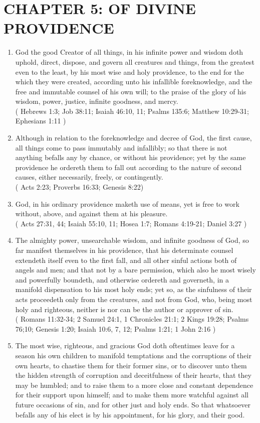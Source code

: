 \documentclass[12pt,a4paper]{book}
\begin{document}
\chapter{CHAPTER 5: OF DIVINE PROVIDENCE}
\label{ch-div-prov}
\begin{enumerate}
\item God the good Creator of all things, in his infinite power and wisdom doth uphold, direct, dispose, and govern all creatures and things, from the greatest even to the least, by his most wise and holy providence, to the end for the which they were created, according unto his infallible foreknowledge, and the free and immutable counsel of his own will; to the praise of the glory of his wisdom, power, justice, infinite goodness, and mercy.\\
( Hebrews 1:3; Job 38:11; Isaiah 46:10, 11; Psalms 135:6; Matthew 10:29-31; Ephesians 1:11 )
\item Although in relation to the foreknowledge and decree of God, the first cause, all things come to pass immutably and infallibly; so that there is not anything befalls any by chance, or without his providence; yet by the same providence he ordereth them to fall out according to the nature of second causes, either necessarily, freely, or contingently.\\
( Acts 2:23; Proverbs 16:33; Genesis 8:22)
\item God, in his ordinary providence maketh use of means, yet is free to work without, above, and against them at his pleasure.\\
( Acts 27:31, 44; Isaiah 55:10, 11; Hosea 1:7; Romans 4:19-21; Daniel 3:27 )
\item The almighty power, unsearchable wisdom, and infinite goodness of God, so far manifest themselves in his providence, that his determinate counsel extendeth itself even to the first fall, and all other sinful actions both of angels and men; and that not by a bare permission, which also he most wisely and powerfully boundeth, and otherwise ordereth and governeth, in a manifold dispensation to his most holy ends; yet so, as the sinfulness of their acts proceedeth only from the creatures, and not from God, who, being most holy and righteous, neither is nor can be the author or approver of sin.\\
( Romans 11:32-34; 2 Samuel 24:1, 1 Chronicles 21:1; 2 Kings 19:28; Psalms 76;10; Genesis 1:20; Isaiah 10:6, 7, 12; Psalms 1:21; 1 John 2:16 )
\item The most wise, righteous, and gracious God doth oftentimes leave for a season his own children to manifold temptations and the corruptions of their own hearts, to chastise them for their former sins, or to discover unto them the hidden strength of corruption and deceitfulness of their hearts, that they may be humbled; and to raise them to a more close and constant dependence for their support upon himself; and to make them more watchful against all future occasions of sin, and for other just and holy ends. So that whatsoever befalls any of his elect is by his appointment, for his glory, and their good.\\

\end{enumerate}
\end{document}
